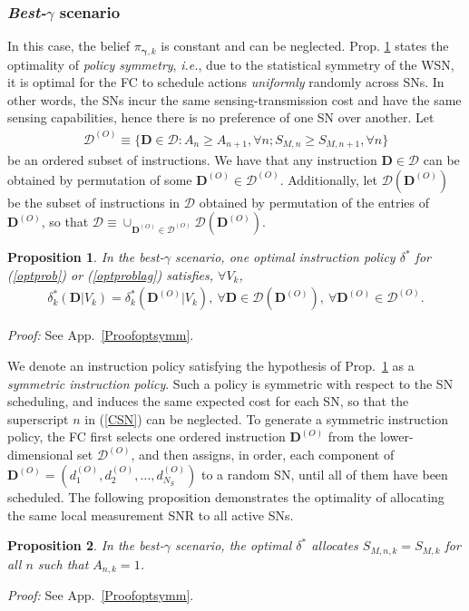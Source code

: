 \documentclass[10pt,twocolumn,twoside]{IEEEtran}
\newtheorem{propos}{Proposition}
\theoremstyle{plain}
\begin{document}
\subsubsection{\emph{Best-}$\gamma$ scenario}
In this case, the belief $\pi_{\boldsymbol{\gamma},k}$ is constant and  can be neglected.
 Prop. \ref{optsymm} states the optimality of \emph{policy symmetry}, \emph{i.e.}, due to the statistical symmetry of the WSN,
it is optimal for the FC to schedule actions \emph{uniformly} randomly  across SNs.
In other words, the SNs incur the same sensing-transmission cost
and have the same sensing capabilities, hence there is no preference of one SN over another.
Let
\begin{align*}
\mathcal D^{(O)}\equiv\{\mathbf D\in\mathcal D:A_{n}\geq A_{n+1},\forall n; S_{M,n}\geq S_{M,n+1},\forall n\}
\end{align*}
be an ordered subset of instructions. We have that any instruction $\mathbf D{\in}\mathcal D$ can be obtained
by permutation of some $\mathbf D^{(O)}{\in}\mathcal D^{(O)}$. Additionally, let $\mathcal D(\mathbf D^{(O)})$ be the subset of instructions in
$\mathcal D$ obtained by permutation of the entries of $\mathbf D^{(O)}$,
so that $\mathcal D{\equiv}\cup_{\mathbf D^{(O)}\in\mathcal D^{(O)}}\mathcal D(\mathbf D^{(O)})$. 
\begin{propos}
\label{optsymm}
In the \emph{best-}$\gamma$ scenario,
one optimal instruction policy $\delta^*$ for (\ref{optprob}) or (\ref{optproblag}) satisfies, $\forall V_k$,
\begin{align*}
\delta_k^*(\mathbf D|V_{k})= \delta_k^*(\mathbf D^{(O)}|V_{k}),\ \forall \mathbf D\in \mathcal D(\mathbf D^{(O)}),\ 
\forall \mathbf D^{(O)}\in\mathcal D^{(O)}.
\end{align*}
\end{propos}
\noindent\emph{Proof:}
See App.~\ref{Proofoptsymm}.
\hfill\QED

\noindent 
We denote an instruction policy satisfying the hypothesis of Prop.~\ref{optsymm}
as a \emph{symmetric instruction policy}. Such a policy is symmetric with respect to the SN scheduling, and induces
 the same expected cost for each SN, so that the superscript $n$ in (\ref{CSN}) can be neglected.
To generate a symmetric instruction policy,
the FC first selects
 one ordered instruction $\mathbf D^{(O)}$ from the lower-dimensional set $\mathcal D^{(O)}$, and then
  assigns, in order, each component of $\mathbf D^{(O)}=(d_1^{(O)},d_2^{(O)},\dots,d_{N_S}^{(O)})$ to a random SN, until
all of them have been scheduled. 
The following proposition
  demonstrates the optimality of
allocating the same local measurement SNR to all active SNs.
\begin{propos}
\label{lem2}
In the \emph{best-}$\gamma$ scenario,
the optimal $\delta^*$ allocates $S_{M,n,k}=S_{M,k}$ for all $n$ such that $A_{n,k}=1$.
\end{propos}
\noindent\emph{Proof:}
See App.~\ref{Proofoptsymm}.
\hfill\QED
\end{document}
